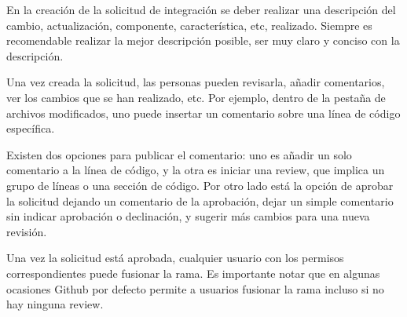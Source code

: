 En la creación de la solicitud de integración se deber realizar una descripción del cambio, actualización, componente, característica, etc, realizado. Siempre es recomendable realizar la mejor descripción posible, ser muy claro y conciso con la descripción. 

Una vez creada la solicitud, las personas pueden revisarla, añadir comentarios, ver los cambios que se han realizado, etc. Por ejemplo, dentro de la pestaña de archivos modificados, uno puede insertar un comentario sobre una línea de código específica. 

Existen dos opciones para publicar el comentario: uno es añadir un solo comentario a la línea de código, y la otra es iniciar una review, que implica un grupo de líneas o una sección de código. Por otro lado está la opción de aprobar la solicitud dejando un comentario de la aprobación,  dejar un simple comentario sin indicar aprobación o declinación, y sugerir más cambios para una nueva revisión.

Una vez la solicitud está aprobada, cualquier usuario con los permisos correspondientes puede fusionar la rama. Es importante notar que en algunas ocasiones Github por defecto permite a usuarios fusionar la rama incluso si no hay ninguna review. 